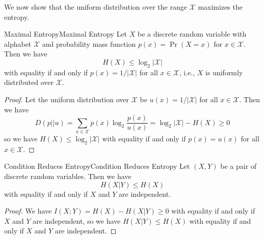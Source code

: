 \documentclass[../main.tex]{subfiles}
\begin{document}
We now show that the uniform distribution over the range $\mathcal{X}$ maximizes the entropy.
\begin{theorem}{Maximal Entropy}{Maximal Entropy}
  Let $X$ be a discrete random variable with alphabet $\mathcal{X}$ and probability mass function $p(x) = \Pr(X=x)$ for $x \in \mathcal{X}$. Then we have
  \begin{equation}
    H(X) \leq \log_2 |\mathcal{X}|
  \end{equation}
  with equality if and only if $p(x) = 1/|\mathcal{X}|$ for all $x \in \mathcal{X}$, i.e., $X$ is uniformly distributed over $\mathcal{X}$.
\end{theorem}
\begin{proof}
  Let the uniform distribution over $\mathcal{X}$ be $u(x) = 1/|\mathcal{X}|$ for all $x \in \mathcal{X}$. Then we have
  \begin{equation*}
    D(p||u) = \sum_{x \in \mathcal{X}} p(x) \log_2 \frac{p(x)}{u(x)} = \log_2 |\mathcal{X}| - H(X) \geq 0
  \end{equation*}
  so we have $H(X) \leq \log_2 |\mathcal{X}|$ with equality if and only if $p(x) = u(x)$ for all $x \in \mathcal{X}$.
\end{proof}

\begin{theorem}{Condition Reduces Entropy}{Condition Reduces Entropy}
  Let $(X,Y)$ be a pair of discrete random variables. Then we have
  \begin{equation}
    H(X|Y) \leq H(X)
  \end{equation}
  with equality if and only if $X$ and $Y$ are independent.
\end{theorem}
\begin{proof}
  We have $I(X;Y) = H(X) - H(X|Y) \geq 0$ with equality if and only if $X$ and $Y$ are independent, so we have $H(X|Y) \leq H(X)$ with equality if and only if $X$ and $Y$ are independent.
\end{proof}
\end{document}
